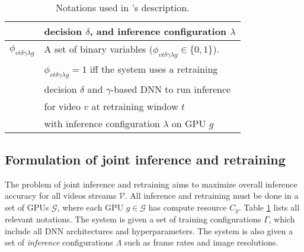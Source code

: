 \begin{table}[t!]
\begin{tabular}{cl}
                                   & decision $\delta$, and inference configuration $\lambda$ \\\hline
$\phi_{vt\delta\gamma\lambda g}$ & A set of binary variables ($\phi_{vt\delta\gamma\lambda g}\in\{0,1\}$). \\
& $\phi_{vt\delta\gamma\lambda g} = 1$ iff the system uses a retraining \\
& decision $\delta$ and $\gamma$-based DNN to run inference\\
& for video $v$ at retraining window $t$ \\
& with inference configuration $\lambda$ on GPU $g$\\\hline
\end{tabular}
\caption{\label{tab:notations}Notations used in {\name}'s description.}
\end{table}

\subsection{\hspace{-0.2cm}Formulation of joint inference and retraining}
\label{subsec:formulation}

The problem of joint inference and retraining aims to maximize overall inference accuracy for all videos streams $\mathcal{V}$. %
All inference and retraining must be done in a set of GPUs $\mathcal{G}$, where each GPU $g \in \mathcal{G}$ has compute resource $C_g$.
Table \ref{tab:notations} lists all relevant notations. 
The system is given a set of training configurations $\Gamma$, which include all DNN architectures and hyperparameters. 
The system is also given a set of \emph{inference} configurations $\Lambda$ such as frame rates and image resolutions.

